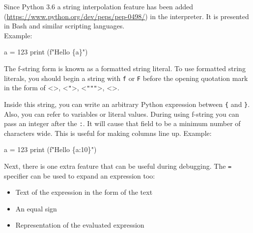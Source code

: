 \documentclass[
]{article}
\newenvironment{Shaded}{}{}
\newcommand{\BuiltInTok}[1]{#1}
\newcommand{\DecValTok}[1]{\textcolor[rgb]{0.25,0.63,0.44}{#1}}
\newcommand{\NormalTok}[1]{#1}
\newcommand{\OperatorTok}[1]{\textcolor[rgb]{0.40,0.40,0.40}{#1}}
\newcommand{\SpecialCharTok}[1]{\textcolor[rgb]{0.25,0.44,0.63}{#1}}
\newcommand{\SpecialStringTok}[1]{\textcolor[rgb]{0.73,0.40,0.53}{#1}}
\begin{document}
Since Python 3.6 a string interpolation feature has been added
(\url{https://www.python.org/dev/peps/pep-0498/}) in the interpreter. It
is presented in Bash and similar scripting languages.\\
Example:

\begin{Shaded}
\begin{Highlighting}[]
\NormalTok{a }\OperatorTok{=} \DecValTok{123}
\BuiltInTok{print}\NormalTok{ (}\SpecialStringTok{f"Hello }\SpecialCharTok{\{}\NormalTok{a}\SpecialCharTok{\}}\SpecialStringTok{"}\NormalTok{)}
\end{Highlighting}
\end{Shaded}

The f-string form is known as a formatted string literal. To use
formatted string literals, you should begin a string with \texttt{f} or
\texttt{F} before the opening quotation mark in the form of
\textless{}\texttt{\textquotesingle{}}\textgreater,
\textless{}\texttt{"}\textgreater, \textless{}\texttt{"""}\textgreater,
\textless{}\texttt{\textquotesingle{}\textquotesingle{}\textquotesingle{}}\textgreater.

Inside this string, you can write an arbitrary Python expression between
\texttt{\{} and \texttt{\}}. Also, you can refer to variables or literal
values. During using f-string you can pass an integer after the
\texttt{:}. It will cause that field to be a minimum number of
characters wide. This is useful for making columns line up. Example:

\begin{Shaded}
\begin{Highlighting}[]
\NormalTok{a }\OperatorTok{=} \DecValTok{123}
\BuiltInTok{print}\NormalTok{ (}\SpecialStringTok{f"Hello }\SpecialCharTok{\{}\NormalTok{a}\SpecialCharTok{:10\}}\SpecialStringTok{"}\NormalTok{)}
\end{Highlighting}
\end{Shaded}

Next, there is one extra feature that can be useful during debugging.
The \texttt{=} specifier can be used to expand an expression too:

\begin{itemize}
\item
  Text of the expression in the form of the text
\item
  An equal sign
\item
  Representation of the evaluated expression
\end{itemize}
\end{document}
